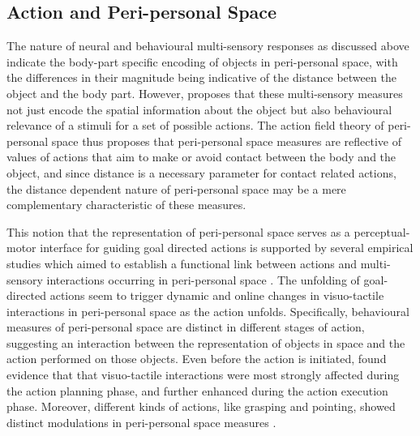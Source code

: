 \subsection{Action and Peri-personal Space}

The nature of neural and behavioural multi-sensory responses as discussed above indicate the body-part specific encoding of objects in peri-personal space, with the differences in their magnitude being indicative of the distance between the object and the body part. However,  proposes that these multi-sensory measures not just encode the spatial information about the object but also behavioural relevance of a stimuli for a set of possible actions. The action field theory of peri-personal space thus proposes that peri-personal space measures are reflective of values of actions that aim to make or avoid contact between the body and the object, and since distance is a necessary parameter for contact related actions, the distance dependent nature of peri-personal space may be a mere complementary characteristic of these measures. 

This notion that the representation of peri-personal space serves as a perceptual-motor interface for guiding goal directed actions is supported by several empirical studies which aimed to establish a functional link between actions and multi-sensory interactions occurring in peri-personal space \cite{ladavas2008action}. The unfolding of goal-directed actions seem to trigger dynamic and online changes in visuo-tactile interactions in peri-personal space as the action unfolds. Specifically, behavioural measures of peri-personal space are distinct in different stages of action, suggesting an interaction between the representation of objects in space and the action performed on those objects. Even before the action is initiated,  found evidence that that visuo-tactile interactions were most strongly affected during the action planning phase, and further enhanced during the action execution phase. Moreover, different kinds of actions, like grasping and pointing, showed distinct modulations in peri-personal space measures \cite{brozzoli2010action}. 

